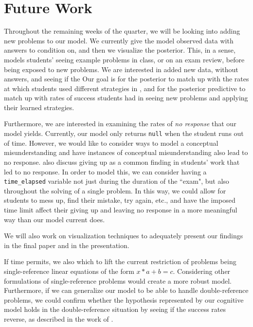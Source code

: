 \documentclass[10pt,letterpaper]{article}
\newcommand\TODO[1]{\textcolor{red}{#1}}
\begin{document}
	
	\section{Future Work}
	Throughout the remaining weeks of the quarter, we will be looking into adding new problems to our model. We currently give the model observed data with answers to condition on, and then we visualize the posterior. This, in a sense, models students' seeing example problems in class, or on an exam review, before being exposed to new problems. We are interested in added new data, without answers, and seeing if the 
	Our goal is for the posterior to match up with the rates at which students used different strategies in \cite{KoedNath2004, 2008}, and for the posterior predictive to match up with rates of success students had in seeing new problems and applying their learned strategies. 
	
	Furthermore, we are interested in examining the rates of \textit{no response} that our model yields. Currently, our model only returns \verb|null| when the student runs out of time. However, we would like to consider ways to model a conceptual misunderstanding and have instances of conceptual misunderstanding also lead to no response.  also discuss giving up as a common finding in students' work that led to no response. In order to model this, we can consider having a \verb|time_elapsed| variable not just during the duration of the ``exam", but also throughout the solving of a single problem. In this way, we could allow for students to mess up, find their mistake, try again, etc., and have the imposed time limit affect their giving up and leaving no response in a more meaningful way than our model current does.
	
	We will also work on visualization techniques to adequately present our findings in the final paper and in the presentation.
	
	If time permits, we also which to lift the current restriction of problems being single-reference linear equations of the form $x*a+b=c$. Considering other formulations of single-reference problems would create a more robust model. Furthermore, if we can generalize our model to be able to handle double-reference problems, we could confirm whether the hypothesis represented by our cognitive model holds in the double-reference situation by seeing if the success rates reverse, as described in the work of .
	
\end{document}
